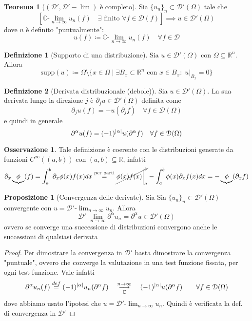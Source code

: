 \documentclass[a4paper,10pt]{article}
\theoremstyle{definition}
\newcommand{\re}{\mathbb{R}} %
\newcommand{\im}{\mathbb{C}} %
\newcommand{\supp}{\text{supp}} %
\newcommand{\llim}[2]{#2\text{-}\lim_{#1\to\infty}} %
\newcommand{\limm}[2]{\overunderset{#1\to\infty}{#2}{\longrightarrow}} %
\theoremstyle{indentdefinition}
\newtheorem{defn}{Definizione}[section]
\theoremstyle{indenttheorem}
\newtheorem{thm}{Teorema}
\newtheorem{prop}{Proposizione}
\theoremstyle{myremark}
\newtheorem*{rem*}{Osservazione}
\theoremstyle{indentgeneral}
\newenvironment{myboxed} 
{\noindent\begin{lrbox}{\mybox}\begin{minipage}{\textwidth}}
{\end{minipage}\end{lrbox}\fbox{\usebox{\mybox}}}
\begin{document}
\begin{thm}[$(\mathcal{D}',\mathcal{D'-}\lim)$ è completo]
    Sia $\{u_n\}_n\subset\mathcal{D}'(\Omega)$ tale che
    $$\left[\im\text{-}\lim_{n\to\infty}u_n(f) \quad \exists\text{ finito }\forall f\in\mathcal{D}(f)\right]\implies u\in\mathcal{D}'(\Omega)$$
    dove $u$ è definito "puntualmente": $$u(f)\coloneqq \im\text{-}\lim_{n\to\infty}u_n(f) \quad \forall f\in\mathcal{D}$$
\end{thm}

\begin{defn}[Supporto di una distribuzione]
    Sia $u\in\mathcal{D}'(\Omega)$ con $\Omega\subseteq\re^n$. Allora 
    $$\supp(u)\coloneqq\Omega\setminus\{x\in\Omega\mid \exists B_x\subset\re^n\text{ con }x\in B_x: \; u|_{B_x}=0\}$$
\end{defn}



\begin{defn}[Derivata distribuzionale (debole)]
    Sia $u\in\mathcal{D}'(\Omega)$. La sua derivata lungo la direzione $j$ è $\partial_ju\in\mathcal{D}'(\Omega)$ definita come 
    $$\partial_ju(f)=-u(\partial_j f)\quad \forall f\in\mathcal{D}(\Omega)$$
    e quindi in generale
    $$\partial^\alpha u(f)=(-1)^\abs{\alpha}u(\partial^\alpha f)\quad \forall f\in\mathcal{D}(\Omega)$$
\end{defn}

\begin{rem*}
    Tale definizione è coerente con le distribuzioni generate da funzioni $C^\infty((a,b))$ con $(a,b)\subseteq\re$, infatti
    $$\partial_x\underbrace{\phi}(f)=\int_a^b\partial_x\phi(x)f(x)dx\overset{\text{per parti}}{=}\cancel{\phi(x)f(x)\bigg|_{a}^b}-\int_a^b\phi(x)\partial_xf(x)dx=-\underbrace{\phi}(\partial_x f)$$
\end{rem*}

\begin{myboxed}
\begin{prop}[Convergenza delle derivate] Sia 
    Sia $\{u_n\}_n\subset\mathcal{D}'(\Omega)$ convergente con $u=\llim{n}{\mathcal{D}'}u_n$. Allora $$\llim{n}{\mathcal{D}'}\partial^\alpha u_n=\partial^\alpha u  \in \mathcal{D}'(\Omega)$$
    ovvero se converge una successione di distribuzioni convergono anche le successioni di qualsiasi derivata
\end{prop}
\end{myboxed}

\begin{proof}
    Per dimostrare la convergenza in $\mathcal{D}'$ basta dimostrare la convergenza "puntuale", ovvero che converge la valutazione in una test funzione fissata, per ogni test funzione. Vale infatti
    $$\partial^\alpha u_n(f)\overset{def}{=}(-1)^\abs{\alpha}u_n(\partial^\alpha f)\quad\limm{n}{\im}\quad(-1)^\abs{\alpha}u(\partial^\alpha f)\qquad \forall f\in\mathcal{D}(\Omega)$$
    dove abbiamo usato l'ipotesi che $u=\llim{n}{\mathcal{D}'}u_n$. Quindi è verificata la def. di convergenza in $\mathcal{D}'$
\end{proof}
\end{document}
